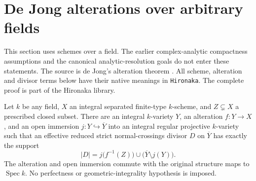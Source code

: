 \section{De Jong alterations over arbitrary fields}

This section uses schemes over a field. The earlier complex-analytic
compactness assumptions and the canonical analytic-resolution goals do not
enter these statements. The source is de Jong's alteration theorem
\cite[Theorem~4.1]{dejong96-alterations}. All scheme, alteration and divisor
terms below have their native meanings in \texttt{Hironaka}.
The complete proof is part of the Hironaka library.

\begin{theorem}
\label{thm:hironaka-dejong-alteration}
\leanok
Let $k$ be any field, $X$ an integral separated finite-type $k$-scheme,
and $Z\subsetneq X$ a prescribed closed subset. There are an integral
$k$-variety $Y$, an alteration $f:Y\to X$, and an open immersion
$j:Y\hookrightarrow\overline Y$ into an integral regular projective
$k$-variety such that an effective reduced strict normal-crossings divisor
$D$ on $\overline Y$ has exactly the support
\[
 |D|=j\bigl(f^{-1}(Z)\bigr)\cup
       \bigl(\overline Y\setminus j(Y)\bigr).
\]
The alteration and open immersion commute with the original structure
maps to $\operatorname{Spec}k$. No perfectness or geometric-integrality
hypothesis is imposed.
\end{theorem}
